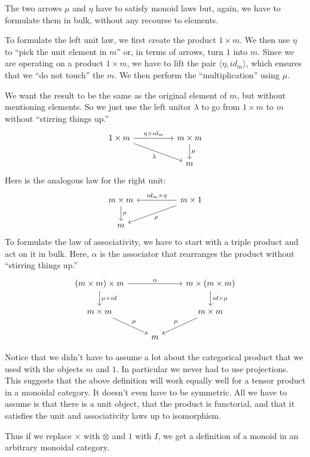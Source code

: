 \documentclass[DaoFP]{subfiles}
\begin{document}
The two arrows $\mu$ and $\eta$ have to satisfy monoid laws but, again, we have to formulate them in bulk, without any recourse to elements.

To formulate the left unit law, we first create the product $1 \times m$. We then use $\eta$ to ``pick the unit element in $m$'' or, in terms of arrows, turn $1$ into $m$. Since we are operating on a product $1 \times m$, we have to lift the pair $\langle \eta, id_m \rangle$, which ensures that we ``do not touch'' the $m$. We then perform the ``multiplication'' using $\mu$. 

We want the result to be the same as the original element of $m$, but without mentioning elements. So we just use the left unitor $\lambda$ to go from $1 \times m$ to $m$ without ``stirring things up.''
\[
 \begin{tikzcd}
 1 \times m
 \arrow[rr, "\eta \times id_m"]
 \arrow[rrd, "\lambda"']
& & m \times m
 \arrow[d, "\mu"]
 \\
 && m
  \end{tikzcd}
\]
Here is the analogous law for the right unit:
\[
 \begin{tikzcd}
 m \times m
 \arrow[d, "\mu"]
 && m \times 1
 \arrow[ll, "id_m \times \eta"']
 \arrow[lld, "\rho"]
 \\
 m
 \end{tikzcd}
\]
To formulate the law of associativity, we have to start with a triple product and act on it in bulk. Here, $\alpha$ is the associator that rearranges the product without ``stirring things up.''
\[
 \begin{tikzcd}
 (m \times m) \times m 
 \arrow[rr, "\alpha"]
 \arrow[d, "\mu \times id"]
 &&
 m \times (m \times m)
 \arrow[d, "id \times \mu"]
 \\
 m \times m 
 \arrow[dr, "\mu"]
& & m \times m
 \arrow[dl, "\mu"']
 \\
&  m
 \end{tikzcd}
\]

Notice that we didn't have to assume a lot about the categorical product that we used with the objects $m$ and $1$. In particular we never had to use projections. This suggests that the above definition will work equally well for a tensor product in a monoidal category. It doesn't even have to be symmetric. All we have to assume is that there is a unit object, that the product is functorial, and that it satisfies the unit and associativity laws up to isomorphism.

Thus if we replace $\times$ with $\otimes$ and $1$ with $I$, we get a definition of a monoid in an arbitrary monoidal category. 
\end{document}
